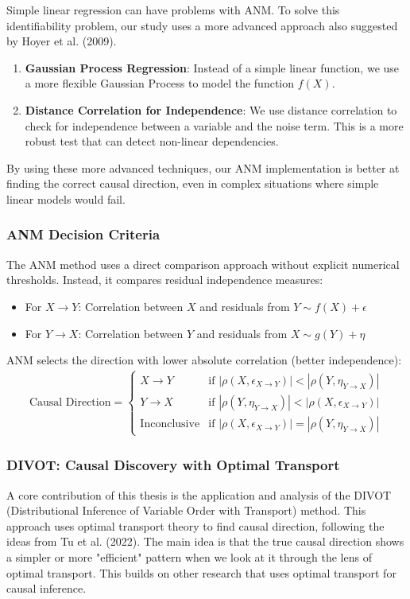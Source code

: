 Simple linear regression can have problems with ANM. To solve this identifiability problem, our study uses a more advanced approach also suggested by Hoyer et al. (2009).
\begin{enumerate}
    \item \textbf{Gaussian Process Regression}: Instead of a simple linear function, we use a more flexible Gaussian Process to model the function $f(X)$.
    \item \textbf{Distance Correlation for Independence}: We use distance correlation to check for independence between a variable and the noise term. This is a more robust test that can detect non-linear dependencies.
\end{enumerate}
By using these more advanced techniques, our ANM implementation is better at finding the correct causal direction, even in complex situations where simple linear models would fail.

\subsubsection{ANM Decision Criteria}

The ANM method uses a direct comparison approach without explicit numerical thresholds. Instead, it compares residual independence measures:

\begin{itemize}
    \item For $X \rightarrow Y$: Correlation between $X$ and residuals from $Y \sim f(X) + \epsilon$
    \item For $Y \rightarrow X$: Correlation between $Y$ and residuals from $X \sim g(Y) + \eta$
\end{itemize}

ANM selects the direction with lower absolute correlation (better independence):
\begin{align}
\text{Causal Direction} = \begin{cases}  
X \rightarrow Y & \text{if } |\rho(X, \epsilon_{X \rightarrow Y})| < |\rho(Y, \eta_{Y \rightarrow X})| \\
Y \rightarrow X & \text{if } |\rho(Y, \eta_{Y \rightarrow X})| < |\rho(X, \epsilon_{X \rightarrow Y})| \\
\text{Inconclusive} & \text{if } |\rho(X, \epsilon_{X \rightarrow Y})| = |\rho(Y, \eta_{Y \rightarrow X})|
\end{cases}
\end{align}

\subsubsection{DIVOT: Causal Discovery with Optimal Transport}
A core contribution of this thesis is the application and analysis of the DIVOT (Distributional Inference of Variable Order with Transport) method. This approach uses optimal transport theory to find causal direction, following the ideas from Tu et al. (2022)\cite{Tu22}. The main idea is that the true causal direction shows a simpler or more "efficient" pattern when we look at it through the lens of optimal transport. This builds on other research that uses optimal transport for causal inference\cite{Charpentier23,Torous24}.

